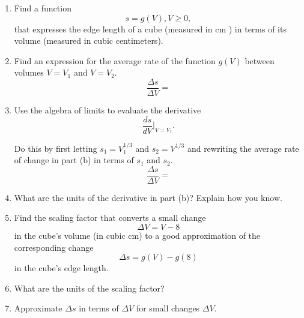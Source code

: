 \documentclass{ximera}
\begin{document}
\begin{example} \label{ExKK3114r3}

\begin{enumerate}

\item Find a function 
\[
   s = g(V) , V\geq 0 ,
\]
that expresses the edge length of a cube (measured in cm ) in terms of its volume (measured in cubic centimeters).

\item Find an expression for the average rate of the function $g(V)$ between volumes $V=V_1$ and $V=V_2$.
\[
   \frac{\Delta s}{\Delta V} = 
\]

\item Use the algebra of limits to evaluate the derivative
\[
       \frac{ds}{dV}\Big|_{V=V_1}.
\]

Do this by first letting $s_1 = V_1^{1/3}$ and $s_2 = V^{1/3}$ and rewriting the average rate of change in part (b) in terms of $s_1$ and $s_2$.
\[
         \frac{\Delta s}{\Delta V}  = 
\]



\item What are the units of the derivative in part (b)? Explain how you know.

\item Find the scaling factor that converts a small change
\[
  \Delta V = V - 8
\]
in the cube's volume (in cubic cm) to a good approximation of the corresponding change
\[
   \Delta s = g(V) -g(8)
\]
in the cube's edge length. 

\item What are the units of the scaling factor?

\item Approximate $\Delta s$ in terms of $\Delta V$ for small changes $\Delta V$.
\end{enumerate}
\end{example}
\end{document}
